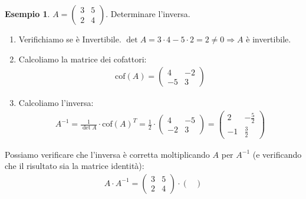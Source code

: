 \documentclass[a4paper]{article}
\theoremstyle{definition}
\newtheorem*{es}{Esempio}
\begin{document}
\begin{es}
	$A = \begin{pmatrix}
			3 & 5 \\
			2 & 4
		\end{pmatrix}$. Determinare l'inversa.
	\begin{enumerate}
		\item Verifichiamo se è Invertibile. $\det A = 3 \cdot 4 - 5 \cdot 2 = 2 \ne 0 \Rightarrow A$ è invertibile.
		\item Calcoliamo la matrice dei cofattori:
		      \begin{align*}
			      \text{cof}(A) = \begin{pmatrix}
				                      4  & -2 \\
				                      -5 & 3
			                      \end{pmatrix}
		      \end{align*}
		\item Calcoliamo l'inversa:
		      \begin{align*}
			      A^{-1} = \frac{1}{\det A} \cdot \text{cof}(A)^T = \frac{1}{2} \cdot \begin{pmatrix}
				                                                                          4  & -5 \\
				                                                                          -2 & 3
			                                                                          \end{pmatrix} = \begin{pmatrix}
				                                                                                          2  & -\frac{5}{2} \\
				                                                                                          -1 & \frac{3}{2}
			                                                                                          \end{pmatrix}
		      \end{align*}
	\end{enumerate}
	Possiamo verificare che l'inversa è corretta moltiplicando $A$ per $A^{-1}$ (e verificando che il risultato sia la matrice identità):
	\begin{align*}
		A \cdot A^{-1} = \begin{pmatrix}
			                 3 & 5 \\
			                 2 & 4
		                 \end{pmatrix} \cdot \begin{pmatrix}

\end{pmatrix}
\end{align*}
\end{es}
\end{document}
